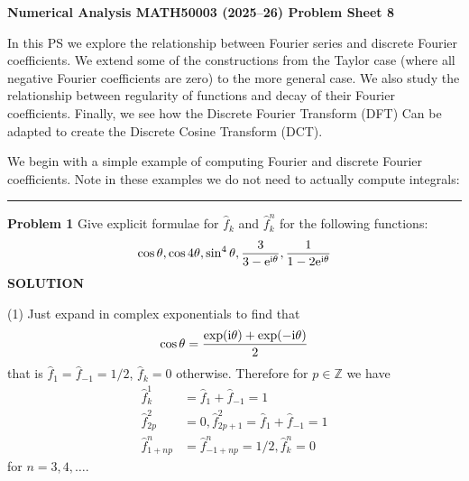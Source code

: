 \documentclass[12pt,a4paper]{article}
\def\endash{–}
\def\bbZ{ {\mathbb Z} }
\begin{document}
\textbf{Numerical Analysis MATH50003 (2025\ensuremath{\endash}26) Problem Sheet 8}

In this PS we explore the relationship between Fourier series and discrete Fourier coefficients.  We extend some of the constructions from the Taylor case (where all negative Fourier coefficients are zero) to the more general case. We also study the relationship between regularity of functions and decay of their Fourier coefficients. Finally, we see how the Discrete Fourier Transform (DFT) Can be adapted to create the Discrete Cosine Transform (DCT).

We begin with a simple example of computing Fourier and discrete Fourier coefficients. Note in these examples we do not need to actually compute integrals:

\rule{\textwidth}{1pt}
\textbf{Problem 1} Give explicit formulae for $\hat f_k$ and $\hat f_k^n$ for the following functions:
\[
\cos \ensuremath{\theta}, \cos 4\ensuremath{\theta}, \sin^4\ensuremath{\theta}, {3 \over 3 - {\rm e}^{\rm i \ensuremath{\theta}}}, {1 \over 1 - 2{\rm e}^{\rm i \ensuremath{\theta}}}
\]
\textbf{SOLUTION}

(1) Just expand in complex exponentials to find that
\[
\cos \ensuremath{\theta} = {\exp({\rm i} \ensuremath{\theta}) + \exp(-{\rm i} \ensuremath{\theta}) \over 2}
\]
that is $\hat f_1 = \hat f_{-1} = 1/2$, $\hat f_k = 0$ otherwise. Therefore for $p\ensuremath{\in} \ensuremath{\bbZ}$ we have
\begin{align*}
\hat f_k^1 &= \hat f_1 + \hat f_{-1} = 1 \\
\hat f_{2p}^2 &= 0, \hat f_{2p+1}^2 = \hat f_1 + \hat f_{-1} = 1 \\
\hat f_{1+np}^n &= \hat f_{-1+np}^n = 1/2, \hat f_k^n = 0
\end{align*}
for $n = 3,4,\ensuremath{\ldots}$.
\end{document}
